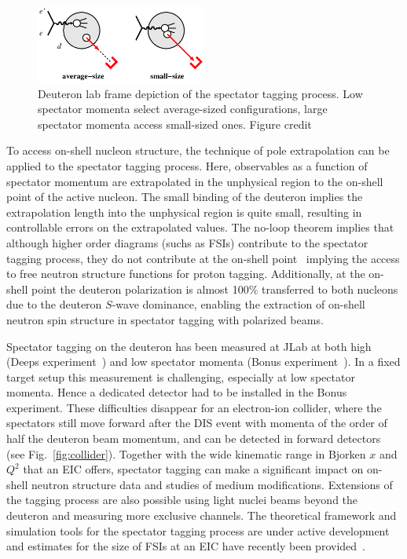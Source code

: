     \begin{figure}
        \includegraphics[width=0.5\textwidth]{plots/deut_tag_restframe}
        \caption{Deuteron lab frame depiction of the spectator tagging process.  Low spectator momenta select average-sized configurations, large spectator momenta access small-sized ones. Figure credit~\cite{deutLDRD}}
        \label{fig:size}
    \end{figure}

To access on-shell nucleon structure, the technique of pole extrapolation can be applied to the spectator tagging process.  Here, observables as a function of spectator momentum are extrapolated in the unphysical region to the on-shell point of the active nucleon.  The small binding of the deuteron implies the extrapolation length into the unphysical region is quite small, resulting in controllable errors on the extrapolated values.  The no-loop theorem implies that although higher order diagrams (suchs as FSIs) contribute to the spectator tagging process, they do not contribute at the on-shell point~\cite{Sargsian:2005rm} implying the access to free neutron structure functions for proton tagging.  Additionally, at the on-shell point the deuteron polarization is almost 100\% transferred to both nucleons due to the deuteron $S$-wave dominance, enabling the extraction of on-shell neutron spin structure in spectator tagging with polarized beams.  

Spectator tagging on the deuteron has been measured at JLab at both high (Deeps experiment~\cite{Klimenko:2005zz}) and low spectator momenta (Bonus experiment~\cite{Baillie:2011za}). In a fixed target setup this measurement is challenging, especially at low spectator momenta. Hence a dedicated detector had to be installed in the Bonus experiment.  These difficulties disappear for an electron-ion collider, where the spectators still move forward after the DIS event with momenta of the order of half the deuteron beam momentum, and can be detected in forward detectors (see Fig.~\ref{fig:collider}).  Together with the wide kinematic range in Bjorken $x$ and $Q^2$ that an EIC offers, spectator tagging can make a significant impact on on-shell neutron structure data and studies of medium modifications.  Extensions of the tagging process are also possible using light nuclei beams beyond the deuteron and measuring more exclusive channels.  The theoretical framework and simulation tools for the spectator tagging process are under active development~\cite{deutLDRD,Guzey:2014jva,Cosyn:2016oiq} and estimates for the size of FSIs at an EIC have recently been provided~\cite{Strikman:2017koc}.

